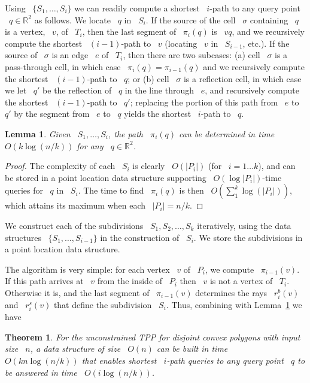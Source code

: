 \documentclass[11pt]{article}
\newtheorem{theorem}{Theorem}
\newtheorem{lemma}{Lemma}
\begin{document}
Using ~\(\{S_1, \ldots, S_i\}\) we can readily compute a shortest ~\(i\)-path to any query point ~\(q \in \mathbb{R}^2\) as follows.
We locate ~\(q\) in ~\(S_i\).
If the source of the cell ~\(\sigma\) containing ~\(q\) is a vertex, ~\(v\), of ~\(T_i\), then the last segment of ~\(\pi_i(q)\) is ~\(vq\), and we recursively compute the shortest ~\((i-1)\)-path to ~\(v\) (locating ~\(v\) in ~\(S_{i-1}\), etc.).
If the source of ~\(\sigma\) is an edge ~\(e\) of ~\(T_i\), then there are two subcases: (a) cell ~\(\sigma\) is a pass-through cell, in which case ~\(\pi_i(q) = \pi_{i-1}(q)\) and we recursively compute the shortest ~\((i-1)\)-path to ~\(q\); or (b) cell ~\(\sigma\) is a reflection cell, in which case we let ~\(q'\) be the reflection of ~\(q\) in the line through ~\(e\), and recursively compute the shortest ~\((i-1)\)-path to ~\(q'\); replacing the portion of this path from ~\(e\) to ~\(q'\) by the segment from ~\(e\) to ~\(q\) yields the shortest ~\(i\)-path to ~\(q\).

\begin{lemma}
\label{lem:pathquery}
Given ~\(S_1, \ldots, S_i\), the path ~\(\pi_i(q)\) can be determined in time ~\(O(k\log(n/k))\) for any ~\(q \in \mathbb{R}^2\).
\end{lemma}

\begin{proof}
The complexity of each ~\(S_i\) is clearly ~\(O(|P_i|)\) (for ~\(i = 1 \ldots k\)), and can be stored in a point location data structure supporting ~\(O(\log|P_i|)\)-time queries for ~\(q\) in ~\(S_i\).
The time to find ~\(\pi_i(q)\) is then ~\(O\!\left(\sum_1^k \log(|P_i|)\right)\), which attains its maximum when each ~\(|P_i| = n/k\).
\end{proof}

We construct each of the subdivisions ~\(S_1, S_2, \ldots, S_k\) iteratively, using the data structures ~\(\{S_1, \ldots, S_{i-1}\}\) in the construction of ~\(S_i\).
We store the subdivisions in a point location data structure.

The algorithm is very simple: for each vertex ~\(v\) of ~\(P_i\), we compute ~\(\pi_{i-1}(v)\).
If this path arrives at ~\(v\) from the inside of ~\(P_i\) then ~\(v\) is not a vertex of ~\(T_i\).
Otherwise it is, and the last segment of ~\(\pi_{i-1}(v)\) determines the rays ~\(r_i^b(v)\) and ~\(r_i^s(v)\) that define the subdivision ~\(S_i\).
Thus, combining with Lemma~\ref{lem:pathquery} we have

\begin{theorem}
\label{thm:unconstrained}
For the unconstrained TPP for disjoint convex polygons with input size ~\(n\), a data structure of size ~\(O(n)\) can be built in time ~\(O(kn\log(n/k))\) that enables shortest ~\(i\)-path queries to any query point ~\(q\) to be answered in time ~\(O(i\log(n/k))\).
\end{theorem}
\end{document}
